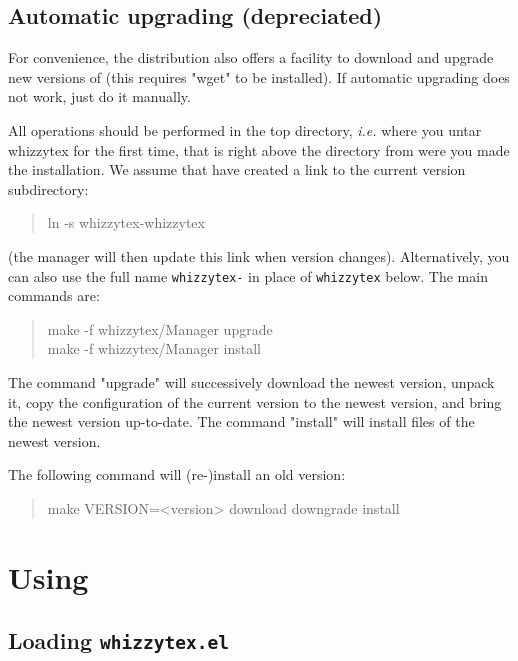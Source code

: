 \documentclass[12pt]{article}
\begin{document}
\subsection {Automatic upgrading (depreciated)}

For convenience, the distribution also offers a facility to download and
upgrade new versions of {\whizzy} (this requires \lst"wget" to be
installed).  If automatic upgrading does not work, just do it manually.

All operations should be performed in the {\whizzy} top directory, {\em
i.e.} where you untar whizzytex for the first time, that is right above the
directory from were you made the installation. We assume that have 
created a link to the current version subdirectory: 
\begin{quote}
\begin{tt}
ln -s whizzytex-\version\space whizzytex
\end{tt}
\end{quote}
(the manager will then update this link when version changes).
Alternatively, you can also use the full name {\tt whizzytex-\version} in
place of {\tt whizzytex} below. The main commands are:
\begin{quote}
\begin{tt}
make -f whizzytex/Manager upgrade \\
make -f whizzytex/Manager install
\end{tt}
\end{quote}
The command \lst"upgrade" will successively download the newest version,
unpack it, copy the configuration of the current version to the newest
version, and bring the newest version up-to-date. The command \lst"install"
will install files of the newest version. 

The following command will (re-)install an old version:
\begin{quote}
\begin{tt}
make VERSION=<version> download downgrade install
\end{tt}
\end{quote}

\section{Using {\protect\whizzy}}
\label{using}

\subsection {Loading {\tt whizzytex.el}}
\end{document}
